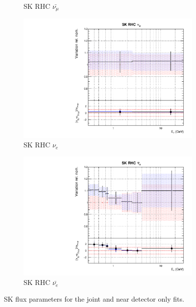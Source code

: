 \begin{figure}
\begin{subfigure}{0.45\textwidth}
  \caption{SK RHC $\bar{\nu_{\mu}}$}
\end{subfigure}
\begin{subfigure}{0.45\textwidth}
  \centering
  \includegraphics[width=0.75\linewidth]{figs/jointflux14}
  \caption{SK RHC $\nu_{e}$}
\end{subfigure}
\begin{subfigure}{0.45\textwidth}
  \centering
  \includegraphics[width=0.75\linewidth]{figs/jointflux15}
  \caption{SK RHC $\bar{\nu_e}$}
\end{subfigure}
\caption{SK flux parameters for the joint and near detector only fits.}
\label{fig:jointfluxSK}
\end{figure}

